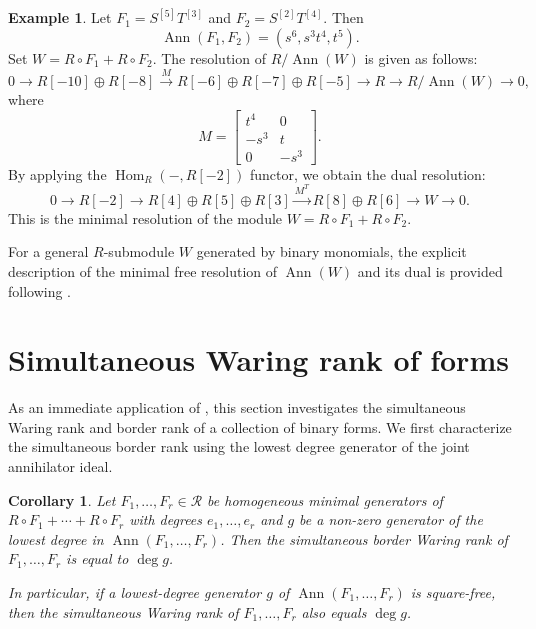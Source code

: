 \documentclass[a4paper, 11pt]{amsart}
\numberwithin{theorem}{section}
\newtheorem{corollary}[theorem]{Corollary}
\theoremstyle{definition}
\newtheorem{example}[theorem]{Example}
\numberwithin{equation}{section}
\DeclareMathOperator{\Ann}{\operatorname{Ann}}
\DeclareMathOperator{\Hom}{\operatorname{Hom}}
\begin{document}
\begin{example}
   Let $F_1 =  S^{[5]} T^{[3]}$ and $F_2 = S^{[2]} T^{[4]}$. Then
   \begin{equation*}
     \Ann(F_1,F_2) = (s^6, s^3 t^4, t^5).
   \end{equation*}
   Set $W = R\circ F_1 + R\circ F_2$.
   The resolution of $R/\Ann(W)$ is given as follows:
   \begin{equation*}
     0 \to R[-10]\oplus R[-8] \xrightarrow{M} R[-6]\oplus R[-7] \oplus R[-5] \to R \to R/\Ann(W) \to 0,
   \end{equation*}
   where
   \begin{equation*}
       M = \begin{bmatrix}
           t^4 & 0 \\
           -s^3 & t \\
           0 & -s^3
       \end{bmatrix}.
   \end{equation*}
   By applying the $\Hom_R(-, R[-2])$ functor, we obtain the dual resolution: 
   \begin{equation*}
     0 \to R[-2]\to R[4]\oplus R[5] \oplus R[3] \xrightarrow{M^T} R[8]\oplus R[6] \to W \to 0.
   \end{equation*}
   This is the minimal resolution of the module $W = R\circ F_1 + R\circ F_2$.
\end{example}
For a general $R$-submodule $W$ generated by binary monomials, the explicit description of the minimal free resolution of $\Ann(W)$ and its dual is provided following .

\section{Simultaneous Waring rank of forms}\label{sec:simultaneous_rank}
As an immediate application of , this section investigates the simultaneous Waring rank and border rank of a collection of binary forms. 
We first characterize the simultaneous border rank using the lowest degree generator of the joint annihilator ideal.
\begin{corollary}\label{cor:bordersimultaneousrank}
    Let $F_1, \dots, F_r\in \mathcal{R}$ be homogeneous minimal generators of $R\circ F_1 + \cdots + R\circ F_r$ with degrees $e_1,\ldots,e_r$ and $g$ be a non-zero generator of the lowest degree in $\operatorname{Ann}(F_1, \dots, F_r)$. 
    Then the simultaneous border Waring rank of $F_1, \dots, F_r$ is equal to $\deg g$.
    
    In particular, if a lowest-degree generator $g$ of $\Ann(F_1,\dots,F_r)$ is square-free, then the simultaneous Waring rank of $F_1, \dots, F_r$ also equals $\deg g$.
\end{corollary}
\end{document}

